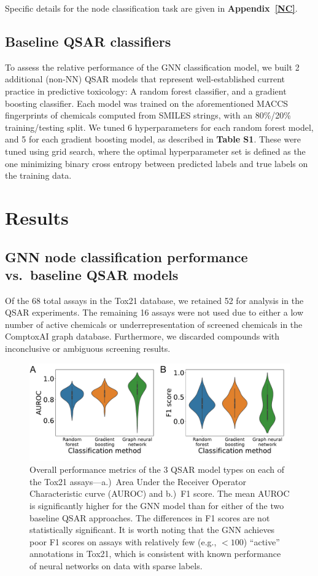 \documentclass{ws-procs11x85}
\begin{document}
Specific details for the node classification task are given in \textbf{Appendix~\ref{NC}}.

\subsection{Baseline QSAR classifiers}
To assess the relative performance of the GNN classification model, we built 2 additional (non-NN) QSAR models that represent well-established current practice in predictive toxicology: A random forest classifier, and a gradient boosting classifier.
Each model was trained on the aforementioned MACCS fingerprints of chemicals computed from SMILES strings, with an 80\%/20\% training/testing split.
We tuned 6 hyperparameters for each random forest model, and 5 for each gradient boosting model, as described in \textbf{Table S1}.
These were tuned using grid search, where the optimal hyperparameter set is defined as the one minimizing binary cross entropy between predicted labels and true labels on the training data.

\section{Results}
\subsection{GNN node classification performance vs.\ baseline QSAR models}
Of the 68 total assays in the Tox21 database, we retained 52 for analysis in the QSAR experiments.
The remaining 16 assays were not used due to either a low number of active chemicals or underrepresentation of screened chemicals in the ComptoxAI graph database.
Furthermore, we discarded compounds with inconclusive or ambiguous screening results.

\begin{figure}
   \centering
   \includegraphics[width=\textwidth]{figures/figure2.pdf}
   \caption{Overall performance metrics of the 3 QSAR model types on each of the Tox21 assays---a.)~Area Under the Receiver Operator Characteristic curve (AUROC) and b.)~F1 score. The mean AUROC is significantly higher for the GNN model than for either of the two baseline QSAR approaches. The differences in F1 scores are not statistically significant. It is worth noting that the GNN achieves poor F1 scores on assays with relatively few (e.g., $< 100$) ``active'' annotations in Tox21, which is consistent with known performance of neural networks on data with sparse labels.}
\end{figure}
\end{document}
